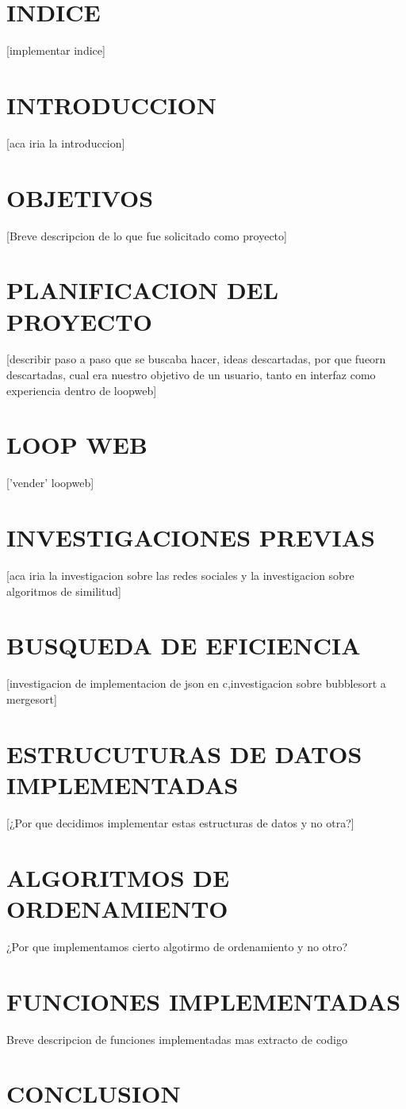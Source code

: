 \section{INDICE}
[implementar indice]
\newpage
\section{INTRODUCCION}
[aca iria la introduccion]
\section{OBJETIVOS}
[Breve descripcion de lo que fue solicitado como proyecto]
\section{PLANIFICACION DEL PROYECTO}
[describir paso a paso que se buscaba hacer, ideas descartadas, por que fueorn descartadas, cual era nuestro objetivo de un usuario, tanto en interfaz como experiencia dentro de loopweb]
\section{LOOP WEB}
['vender' loopweb]
\section{INVESTIGACIONES PREVIAS}
[aca iria la investigacion sobre las redes sociales y la investigacion sobre algoritmos de similitud]
\section{BUSQUEDA DE EFICIENCIA}
[investigacion de implementacion de json en c,investigacion sobre bubblesort a mergesort]
\section{ESTRUCUTURAS DE DATOS IMPLEMENTADAS}
[¿Por que decidimos implementar estas estructuras de datos y no otra?]
\section{ALGORITMOS DE ORDENAMIENTO}
 ¿Por que implementamos cierto algotirmo de ordenamiento y no otro?
 \section{FUNCIONES IMPLEMENTADAS}
Breve descripcion de funciones implementadas mas extracto de codigo
\section{CONCLUSION}
